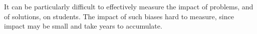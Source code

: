 It can be particularly difficult to effectively measure the impact of problems, and of solutions, on students.  %
The impact of such biases hard to measure, since impact may be small and take years to accumulate. %

